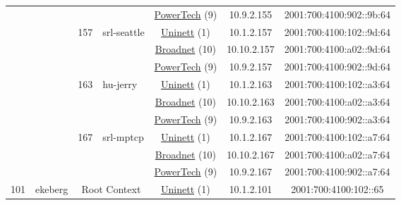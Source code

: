 \begin{small}
\begin{center}
\begin{longtable}{|c|c|c|c|c|c|c|c|}
  &  &  &  & \multicolumn{2}{|c|}{\tiny{\href{http://www.powertech.no}{PowerTech} (9)}} & \tiny{10.9.2.155} & \tiny{2001:700:4100:902::9b:64} \\* \cline{3-3}\cline{4-4}\cline{5-5}\cline{6-6}\cline{7-7}\cline{8-8}
  &  & \multirow{3}{*}{\tiny{157}} & \multicolumn{1}{|l|}{\multirow{3}{*}{\tiny{srl-seattle}}} & \multicolumn{2}{|c|}{\tiny{\href{https://www.uninett.no}{Uninett} (1)}} & \tiny{10.1.2.157} & \tiny{2001:700:4100:102::9d:64} \\* \cline{5-5}\cline{6-6}\cline{7-7}\cline{8-8}
  &  &  &  & \multicolumn{2}{|c|}{\tiny{\href{https://www.broadnet.no}{Broadnet} (10)}} & \tiny{10.10.2.157} & \tiny{2001:700:4100:a02::9d:64} \\* \cline{5-5}\cline{6-6}\cline{7-7}\cline{8-8}
  &  &  &  & \multicolumn{2}{|c|}{\tiny{\href{http://www.powertech.no}{PowerTech} (9)}} & \tiny{10.9.2.157} & \tiny{2001:700:4100:902::9d:64} \\* \cline{3-3}\cline{4-4}\cline{5-5}\cline{6-6}\cline{7-7}\cline{8-8}
  &  & \multirow{3}{*}{\tiny{163}} & \multicolumn{1}{|l|}{\multirow{3}{*}{\tiny{hu-jerry}}} & \multicolumn{2}{|c|}{\tiny{\href{https://www.uninett.no}{Uninett} (1)}} & \tiny{10.1.2.163} & \tiny{2001:700:4100:102::a3:64} \\* \cline{5-5}\cline{6-6}\cline{7-7}\cline{8-8}
  &  &  &  & \multicolumn{2}{|c|}{\tiny{\href{https://www.broadnet.no}{Broadnet} (10)}} & \tiny{10.10.2.163} & \tiny{2001:700:4100:a02::a3:64} \\* \cline{5-5}\cline{6-6}\cline{7-7}\cline{8-8}
  &  &  &  & \multicolumn{2}{|c|}{\tiny{\href{http://www.powertech.no}{PowerTech} (9)}} & \tiny{10.9.2.163} & \tiny{2001:700:4100:902::a3:64} \\* \cline{3-3}\cline{4-4}\cline{5-5}\cline{6-6}\cline{7-7}\cline{8-8}
  &  & \multirow{3}{*}{\tiny{167}} & \multicolumn{1}{|l|}{\multirow{3}{*}{\tiny{srl-mptcp}}} & \multicolumn{2}{|c|}{\tiny{\href{https://www.uninett.no}{Uninett} (1)}} & \tiny{10.1.2.167} & \tiny{2001:700:4100:102::a7:64} \\* \cline{5-5}\cline{6-6}\cline{7-7}\cline{8-8}
  &  &  &  & \multicolumn{2}{|c|}{\tiny{\href{https://www.broadnet.no}{Broadnet} (10)}} & \tiny{10.10.2.167} & \tiny{2001:700:4100:a02::a7:64} \\* \cline{5-5}\cline{6-6}\cline{7-7}\cline{8-8}
  &  &  &  & \multicolumn{2}{|c|}{\tiny{\href{http://www.powertech.no}{PowerTech} (9)}} & \tiny{10.9.2.167} & \tiny{2001:700:4100:902::a7:64} \\ \hline
 \multirow{27}{*}{\tiny{101}} & \multicolumn{1}{|l|}{\multirow{27}{*}{\tiny{ekeberg}}} & \multicolumn{2}{|c|}{\multirow{3}{*}{\tiny{Root Context}}} & \multicolumn{2}{|c|}{\tiny{\href{https://www.uninett.no}{Uninett} (1)}} & \tiny{10.1.2.101} & \tiny{2001:700:4100:102::65} \\* \cline{5-5}\cline{6-6}\cline{7-7}\cline{8-8}

\end{longtable}
\end{center}
\end{small}
